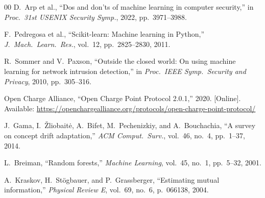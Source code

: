 \documentclass[preprint,12pt]{elsarticle}
\begin{document}
\begin{thebibliography}{00}
 D.\ Arp et al., ``Dos and don'ts of machine learning in computer security,'' in \emph{Proc.\ 31st USENIX Security Symp.}, 2022, pp.\ 3971--3988.

 F.\ Pedregosa et al., ``Scikit-learn: Machine learning in Python,'' \emph{J.\ Mach.\ Learn.\ Res.}, vol.\ 12, pp.\ 2825--2830, 2011.

 R.\ Sommer and V.\ Paxson, ``Outside the closed world: On using machine learning for network intrusion detection,'' in \emph{Proc.\ IEEE Symp.\ Security and Privacy}, 2010, pp.\ 305--316.

 Open Charge Alliance, ``Open Charge Point Protocol 2.0.1,'' 2020. [Online]. Available: \url{https://openchargealliance.org/protocols/open-charge-point-protocol/}

 J.\ Gama, I.\ \v{Z}liobait\.{e}, A.\ Bifet, M.\ Pechenizkiy, and A.\ Bouchachia, ``A survey on concept drift adaptation,'' \emph{ACM Comput.\ Surv.}, vol.\ 46, no.\ 4, pp.\ 1--37, 2014.

 L.\ Breiman, ``Random forests,'' \emph{Machine Learning}, vol.\ 45, no.\ 1, pp.\ 5--32, 2001.

 A.\ Kraskov, H.\ St\"{o}gbauer, and P.\ Grassberger, ``Estimating mutual information,'' \emph{Physical Review E}, vol.\ 69, no.\ 6, p.\ 066138, 2004.

\end{thebibliography}
\end{document}
